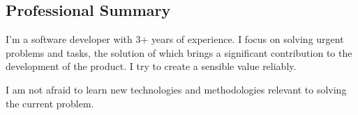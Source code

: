 \subsection*{Professional Summary}
    I'm a software developer with 3+ years of experience. I focus on solving urgent problems and tasks, the solution of which brings a significant contribution to the development of the product.
    I try to create a sensible value reliably. 
    
    I am not afraid to learn new technologies and methodologies relevant to solving the current problem.
   
    
